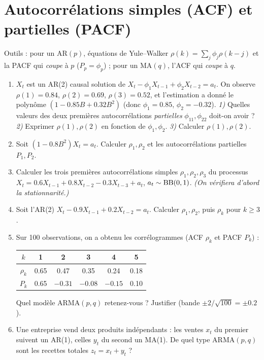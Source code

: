 \documentclass[11pt]{article}
\begin{document}
\section{Autocorrélations simples (ACF) et partielles (PACF)}
\begin{contexte}
Outils : pour un AR$(p)$, équations de Yule--Walker $\rho(k)=\sum_j\phi_j\rho(k-j)$ et la PACF
qui \emph{coupe} à $p$ ($P_p=\phi_p$) ; pour un MA$(q)$, l'ACF qui \emph{coupe} à $q$.
\end{contexte}
\begin{enumerate}[label=\textbf{Q\,D.\arabic*},leftmargin=*]
\item $X_t$ est un AR(2) causal solution de $X_t-\phi_1X_{t-1}+\phi_2X_{t-2}=a_t$.
On observe $\rho(1)=0.84$, $\rho(2)=0.69$, $\rho(3)=0.52$, et l'estimation a donné le polynôme
$(1-0.85B+0.32B^2)$ (donc $\phi_1=0.85$, $\phi_2=-0.32$).
\emph{1)} Quelles valeurs des deux premières autocorrélations \emph{partielles}
$\phi_{11},\phi_{22}$ doit-on avoir ? \emph{2)} Exprimer $\rho(1),\rho(2)$ en fonction de
$\phi_1,\phi_2$. \emph{3)} Calculer $\rho(1),\rho(2)$.

\item Soit $(1-0.8B^2)X_t=a_t$. Calculer $\rho_1,\rho_2$ et les autocorrélations partielles
$P_1,P_2$.

\item Calculer les trois premières autocorrélations simples $\rho_1,\rho_2,\rho_3$ du
processus $X_t=0.6X_{t-1}+0.8X_{t-2}-0.3X_{t-3}+a_t$, $a_t\sim\operatorname{BB}(0,1)$. \emph{(On vérifiera
d'abord la stationnarité.)}

\item Soit l'AR(2) $X_t-0.9X_{t-1}+0.2X_{t-2}=a_t$. Calculer $\rho_1,\rho_2$, puis $\rho_k$
pour $k\ge3$.

\item Sur 100 observations, on a obtenu les corrélogrammes (ACF $\rho_k$ et PACF $P_k$) :
\begin{center}\small
\begin{tabular}{cccccc}\toprule
$k$&1&2&3&4&5\\\midrule
$\rho_k$&0.65&0.47&0.35&0.24&0.18\\
$P_k$&0.65&$-0.31$&$-0.08$&$-0.15$&0.10\\\bottomrule
\end{tabular}
\end{center}
Quel modèle ARMA$(p,q)$ retenez-vous ? Justifier (bande $\pm2/\sqrt{100}=\pm0.2$).

\item Une entreprise vend deux produits indépendants : les ventes $x_t$ du premier suivent un
AR(1), celles $y_t$ du second un MA(1). De quel type ARMA$(p,q)$ sont les recettes totales
$z_t=x_t+y_t$ ?
\end{enumerate}
\end{document}
